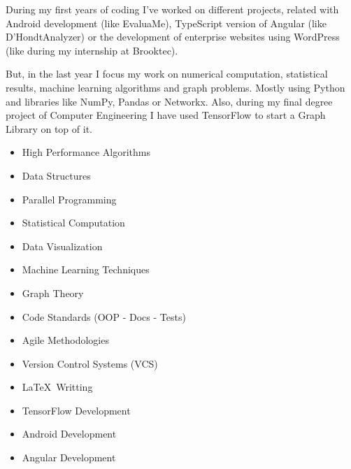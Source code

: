 \documentclass[]{friggeri-cv} %
\begin{document}
        During my first years of coding I've worked on different projects, related with Android development (like EvaluaMe), TypeScript version of Angular (like D'HondtAnalyzer) or the development of enterprise websites using WordPress (like during my internship at Brooktec).

        But, in the last year I focus my work on numerical computation, statistical results, machine learning algorithms and graph problems. Mostly using Python and libraries like NumPy, Pandas or Networkx. Also, during my final degree project of Computer Engineering I have used TensorFlow to start a Graph Library on top of it.

        \noindent
        \begin{minipage}[t]{0.5\linewidth}
          \begin{itemize}
          	\item{High Performance Algorithms}
      	    \item{Data Structures}
            \item{Parallel Programming}
            \item{Statistical Computation}
            \item{Data Visualization}
            \item{Machine Learning Techniques}
            \item{Graph Theory}
          \end{itemize}
        \end{minipage}%
        \begin{minipage}[t]{0.5\linewidth}
          \begin{itemize}
            \item{Code Standards (OOP - Docs - Tests)}
            \item{Agile Methodologies}
            \item{Version Control Systems (VCS)}
          	\item{\LaTeX \ Writting}
            \item{TensorFlow Development}
            \item{Android Development}
            \item{Angular Development}
          \end{itemize}
        \end{minipage}
        \par\bigskip

\end{document}
